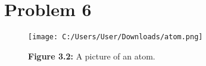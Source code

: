 \documentclass[12pt]{article}
\begin{document}
\section{Problem 6}


\begin{figure}

\texttt{[image: C:/Users/User/Downloads/atom.png]}
  \caption{\textbf{Figure 3.2:} A picture of an atom.}
  \centering

\end{figure}
\end{document}
